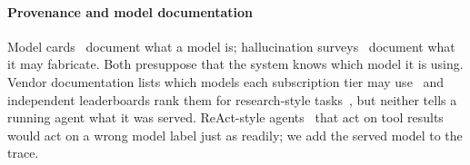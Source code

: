 \paragraph{Provenance and model documentation}
Model cards~\cite{mitchell2019modelcards} document what a model is; hallucination surveys~\cite{ji2023hallucination} document what it may fabricate. Both presuppose that the system knows which model it is using. Vendor documentation lists which models each subscription tier may use~\cite{githubdocs2026models} and independent leaderboards rank them for research-style tasks~\cite{artificialanalysis2026}, but neither tells a running agent what it was served. ReAct-style agents~\cite{yao2023react} that act on tool results would act on a wrong model label just as readily; we add the served model to the trace.
